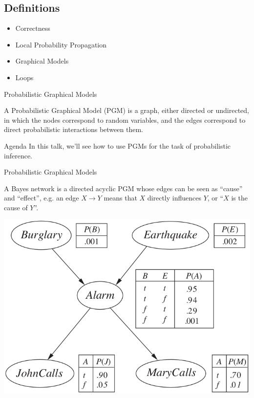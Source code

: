 \documentclass[handout]{beamer}
\begin{document}
\subsection{Definitions}
\begin{frame}
    \begin{itemize}
        \item Correctness
        \item Local Probability Propagation
        \item \alert<2>{Graphical Models}
        \item Loops
    \end{itemize}
\end{frame}
\begin{frame}{Probabilistic Graphical Models}
    \pause
    \begin{definition}
        A Probabilistic Graphical Model (PGM) is a graph, either directed or undirected, in which the nodes correspond to random variables,
        and the edges correspond to direct probabilistic interactions between them.
    \end{definition}
    \begin{block}{Agenda}
        \pause
        In this talk, we'll see how to use PGMs for the task of probabilistic inference.
    \end{block}
\end{frame}
\begin{frame}{Probabilistic Graphical Models}
    \pause
    \begin{definition}
        A Bayes network is a directed acyclic PGM whose edges can be seen as ``cause'' and ``effect'', e.g. an
        edge $ X \rightarrow Y $ means that $ X $ directly influences $ Y $, or ``$ X $ is the cause of $ Y $''.
    \end{definition}
    \pause
    \begin{center}
        \includegraphics[scale=0.25]{bayesnet}
    \end{center}
\end{frame}
\end{document}
